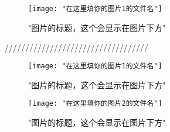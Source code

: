 \begin{figure}[H]
	\texttt{[image: "在这里填你的图片1的文件名"]}
	\centering
	\label{"可以和caption保持一致，也可以不写"}
	\caption{"图片的标题，这个会显示在图片下方"}
	\centering
\end{figure}
///////////////////////////////////
\begin{figure}[H]
	\begin{minipage}{0.5\textwidth}
		\texttt{[image: "在这里填你的图片1的文件名"]}
		\caption{"图片的标题，这个会显示在图片下方"}
		\label{"可以和caption保持一致，也可以不写"}
	\end{minipage}
	\hfill
	\begin{minipage}{0.5\textwidth}
		\texttt{[image: "在这里填你的图片2的文件名"]}
		\caption{"图片的标题，这个会显示在图片下方"}
		\label{"可以和caption保持一致，也可以不写"}
	\end{minipage}
\end{figure}
